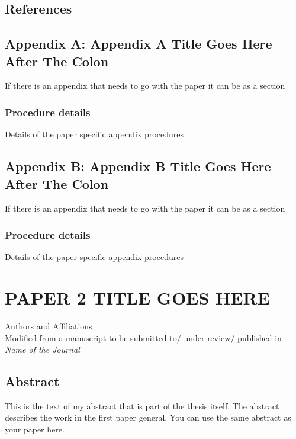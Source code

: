 \documentclass[
  12pt,
  notitlepage]{isuthesis}
\begin{document}
\section{References}
\printbibliography[heading=none, section=2]

\section{Appendix A: Appendix A Title Goes Here After The Colon}

If there is an appendix that needs to go with the paper it can be as a section \cite{Aup91}

\subsection{Procedure details}

Details of the paper specific appendix procedures

\section{Appendix B: Appendix B Title Goes Here After The Colon}

If there is an appendix that needs to go with the paper it can be as a section \cite{Aup91}

\subsection{Procedure details}

Details of the paper specific appendix procedures
\endrefsection

\chapter{PAPER 2 TITLE GOES HERE}

\begin{center}
    Authors and Affiliations \\
    Modified from a manuscript to be submitted to/ under review/ published in \textit{Name of the Journal} 
\end{center}

\section{Abstract}

This is the text of my abstract that is part of the thesis itself.
The abstract describes the work in the first paper general. You can use the same abstract as your paper here.
\end{document}
